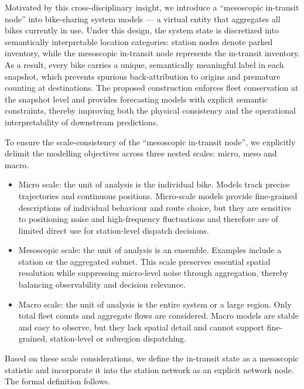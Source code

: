 \documentclass[preprint,12pt,authoryear]{elsarticle}
\begin{document}
Motivated by this cross-disciplinary insight, we introduce a ``mesoscopic in-transit node'' into bike-sharing system models — a virtual entity that aggregates all bikes currently in use. Under this design, the system state is discretized into semantically interpretable location categories: station nodes denote parked inventory, while the mesoscopic in-transit node represents the in-transit inventory. As a result, every bike carries a unique, semantically meaningful label in each snapshot, which prevents spurious back-attribution to origins and premature counting at destinations. The proposed construction enforces fleet conservation at the snapshot level and provides forecasting models with explicit semantic constraints, thereby improving both the physical consistency and the operational interpretability of downstream predictions.

To ensure the scale-consistency of the ``mesoscopic in-transit node'', we explicitly delimit the modelling objectives across three nested scales: micro, meso and macro.

\begin{itemize}
\item Micro scale: the unit of analysis is the individual bike. Models track precise trajectories and continuous positions. Micro-scale models provide fine-grained descriptions of individual behaviour and route choice, but they are sensitive to positioning noise and high-frequency fluctuations and therefore are of limited direct use for station-level dispatch decisions.
\item Mesoscopic scale: the unit of analysis is an ensemble. Examples include a station or the aggregated subnet. This scale preserves essential spatial resolution while suppressing micro-level noise through aggregation, thereby balancing observability and decision relevance.
\item Macro scale: the unit of analysis is the entire system or a large region. Only total fleet counts and aggregate flows are considered. Macro models are stable and easy to observe, but they lack spatial detail and cannot support fine-grained, station-level or subregion dispatching.
\end{itemize}
Based on these scale considerations, we define the in-transit state as a mesoscopic statistic and incorporate it into the station network as an explicit network node. The formal definition follows.
\end{document}
